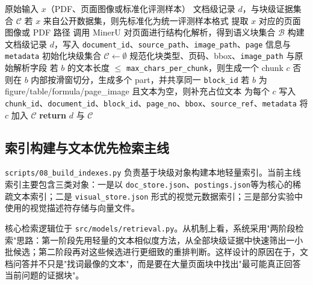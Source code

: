\documentclass{SYSUReport}
\begin{document}
\begin{algorithm}[H]
    \caption{文档解析与块级切分流程}
    \label{alg:parse}
    \begin{algorithmic}[1]
        \REQUIRE 原始输入 $x$（PDF、页面图像或标准化评测样本）
        \ENSURE 文档级记录 $d$，与块级证据集合 $\mathcal{C}$
        \STATE 若 $x$ 来自公开数据集，则先标准化为统一评测样本格式
        \STATE 提取 $x$ 对应的页面图像或 PDF 路径
        \STATE 调用 MinerU 对页面进行结构化解析，得到语义块集合 $\mathcal{B}$
        \STATE 构建文档级记录 $d$，写入 \texttt{document\_id}、\texttt{source\_path}、\texttt{image\_path}、\texttt{page} 信息与 \texttt{metadata}
        \STATE 初始化块级集合 $\mathcal{C} \leftarrow \emptyset$
            \STATE 规范化块类型、页码、bbox、\texttt{image\_path} 与原始解析字段
            \STATE 若 $b$ 的文本长度 $\le$ \texttt{max\_chars\_per\_chunk}，则生成一个 chunk $c$
            \STATE 否则在 $b$ 内部按滑窗切分，生成多个 part，并共享同一 \texttt{block\_id}
            \STATE 若 $b$ 为 figure/table/formula/page\_image 且文本为空，则补充占位文本
            \STATE 为每个 $c$ 写入 \texttt{chunk\_id}、\texttt{document\_id}、\texttt{block\_id}、\texttt{page\_no}、\texttt{bbox}、\texttt{source\_ref}、\texttt{metadata}
            \STATE 将 $c$ 加入 $\mathcal{C}$
        \ENDFOR
        \STATE \textbf{return} $d$ 与 $\mathcal{C}$
    \end{algorithmic}
\end{algorithm}

\subsection{索引构建与文本优先检索主线}

\texttt{scripts/08\_build\_indexes.py} 负责基于块级对象构建本地轻量索引。当前主线索引主要包含三类对象：一是以 \texttt{doc\_store.json}、\texttt{postings.json}等为核心的稀疏文本索引；二是 \texttt{visual\_store.json} 形式的视觉元数据索引；三是部分实验中使用的视觉描述符存储与向量文件。

核心检索逻辑位于 \texttt{src/models/retrieval.py}。从机制上看，系统采用"两阶段检索"思路：第一阶段先用轻量的文本相似度方法，从全部块级证据中快速筛出一小批候选；第二阶段再对这些候选进行更细致的重排判断。这样设计的原因在于，文档问答并不只是"找词最像的文本"，而是要在大量页面块中找出"最可能真正回答当前问题的证据块"。
\end{document}

